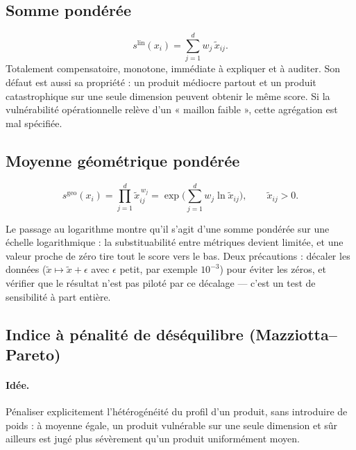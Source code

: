 \documentclass[11pt,a4paper]{article}
\theoremstyle{definition}
\theoremstyle{remark}
\begin{document}
\bigskip

\subsection{Somme pondérée}

\medskip

\[
s^{\mathrm{lin}}(x_i) = \sum_{j=1}^d w_j\,\tilde{x}_{ij}.
\]
Totalement compensatoire, monotone, immédiate à expliquer et à auditer. Son défaut est aussi sa
propriété : un produit médiocre partout et un produit catastrophique sur une seule dimension
peuvent obtenir le même score. Si la vulnérabilité opérationnelle relève d'un « maillon faible »,
cette agrégation est mal spécifiée.

\subsection{Moyenne géométrique pondérée}
\label{sec:geo}

\medskip

\[
s^{\mathrm{geo}}(x_i) = \prod_{j=1}^d \tilde{x}_{ij}^{\,w_j}
= \exp\Big(\sum_{j=1}^d w_j \ln \tilde{x}_{ij}\Big),
\qquad \tilde{x}_{ij} > 0.
\]

\bigskip

Le passage au logarithme montre qu'il s'agit d'une somme pondérée sur une échelle logarithmique :
la substituabilité entre métriques devient limitée, et une valeur proche de zéro tire tout le
score vers le bas. Deux précautions : décaler les données ($\tilde{x} \mapsto \tilde{x} + \epsilon$
avec $\epsilon$ petit, par exemple $10^{-3}$) pour éviter les zéros, et vérifier que le résultat
n'est pas piloté par ce décalage --- c'est un test de sensibilité à part entière.

\bigskip

\subsection{Indice à pénalité de déséquilibre (Mazziotta--Pareto)}
\label{sec:mpi}

\medskip

\paragraph{Idée.} Pénaliser explicitement l'hétérogénéité du profil d'un produit, sans introduire
de poids : à moyenne égale, un produit vulnérable sur une seule dimension et sûr ailleurs est
jugé plus sévèrement qu'un produit uniformément moyen.
\end{document}
